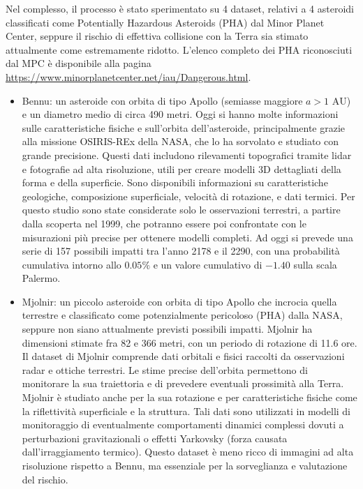 \documentclass[12pt,a4paper,openright,twoside]{book}
\begin{document}
Nel complesso, il processo è stato sperimentato su 4 dataset, relativi a 4 asteroidi classificati come Potentially Hazardous Asteroids (PHA) dal Minor Planet Center, seppure il rischio di effettiva collisione con la Terra sia stimato attualmente come estremamente ridotto. L'elenco completo dei PHA riconosciuti dal MPC è disponibile alla pagina \url{https://www.minorplanetcenter.net/iau/Dangerous.html}.
\begin{itemize}
\item Bennu: un asteroide con orbita di tipo Apollo (semiasse maggiore $a>1\text{ AU}$) e un diametro medio di circa 490 metri. Oggi si hanno molte informazioni sulle caratteristiche fisiche e sull'orbita dell'asteroide, principalmente grazie alla missione OSIRIS-REx della NASA, che lo ha sorvolato e studiato con grande precisione. Questi dati includono rilevamenti topografici tramite lidar e fotografie ad alta risoluzione, utili per creare modelli 3D dettagliati della forma e della superficie. Sono disponibili informazioni su caratteristiche geologiche, composizione superficiale, velocità di rotazione, e dati termici. Per questo studio sono state considerate solo le osservazioni terrestri, a partire dalla scoperta nel 1999, che potranno essere poi confrontate con le misurazioni più precise per ottenere modelli completi. Ad oggi si prevede una serie di 157 possibili impatti tra l'anno 2178 e il 2290, con una probabilità cumulativa intorno allo $0.05\%$ e un valore cumulativo di $-1.40$ sulla scala Palermo.

\item Mjolnir: un piccolo asteroide con orbita di tipo Apollo che incrocia quella terrestre e classificato come potenzialmente pericoloso (PHA) dalla NASA, seppure non siano attualmente previsti possibili impatti. Mjolnir ha dimensioni stimate fra 82 e 366 metri, con un periodo di rotazione di 11.6 ore. Il dataset di Mjolnir comprende dati orbitali e fisici raccolti da osservazioni radar e ottiche terrestri. Le stime precise dell'orbita permettono di monitorare la sua traiettoria e di prevedere eventuali prossimità alla Terra. Mjolnir è studiato anche per la sua rotazione e per caratteristiche fisiche come la riflettività superficiale e la struttura. Tali dati sono utilizzati in modelli di monitoraggio di eventualmente comportamenti dinamici complessi dovuti a perturbazioni gravitazionali o effetti Yarkovsky (forza causata dall'irraggiamento termico). Questo dataset è meno ricco di immagini ad alta risoluzione rispetto a Bennu, ma essenziale per la sorveglianza e valutazione del rischio.


\end{itemize}
\end{document}
